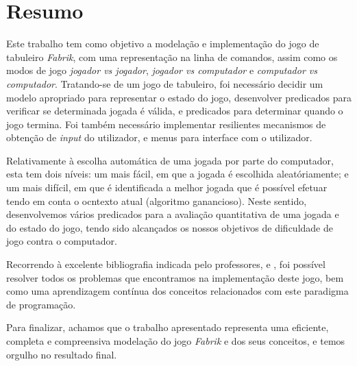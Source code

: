 \documentclass[a4paper]{article}
\begin{document}

\newpage

\section*{Resumo}

Este trabalho tem como objetivo a modelação e implementação do jogo de tabuleiro \textit{Fabrik}, com uma representação na linha de comandos, assim como os modos de jogo \textit{jogador vs jogador}, \textit{jogador vs computador} e \textit{computador vs computador}. Tratando-se de um jogo de tabuleiro, foi necessário decidir um modelo apropriado para representar o estado do jogo, desenvolver predicados para verificar se determinada jogada é válida, e predicados para determinar quando o jogo termina. Foi também necessário implementar resilientes mecanismos de obtenção de \textit{input} do utilizador, e menus para interface com o utilizador.

Relativamente à escolha automática de uma jogada por parte do computador, esta tem dois níveis: um mais fácil, em que a jogada é escolhida aleatóriamente; e um mais difícil, em que é identificada a melhor jogada que é possível efetuar tendo em conta o ocntexto atual (algoritmo ganancioso). Neste sentido, desenvolvemos vários predicados para a avaliação quantitativa de uma jogada e do estado do jogo, tendo sido alcançados os nossos objetivos de dificuldade de jogo contra o computador.

Recorrendo à excelente bibliografia indicada pelo professores, \cite{sterling_shapiro_warren_2010} e \cite{carlsson_fruhwirth_2016}, foi possível resolver todos os problemas que encontramos na implementação deste jogo, bem como uma aprendizagem contínua dos conceitos relacionados com este paradigma de programação.

Para finalizar, achamos que o trabalho apresentado representa uma eficiente, completa e compreensiva modelação do jogo \textit{Fabrik} e dos seus conceitos, e temos orgulho no resultado final.

\newpage

\tableofcontents

\end{document}
